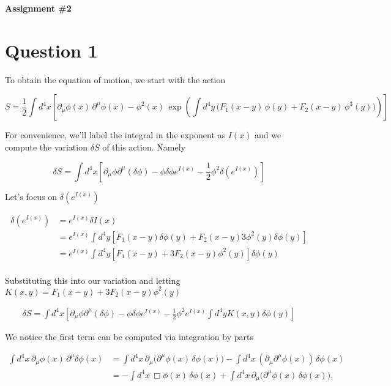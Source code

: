 \documentclass[12pt]{article}
\newcommand{\delmu}{\partial_{\mu}}
\newcommand{\delMu}{\partial^{\mu}}
\begin{document}
\begin{center}
    \Large \textbf{Assignment \#2}
\end{center}
\vspace{1cm}

\section*{Question 1}
To obtain the equation of motion, we start with the action

\begin{equation*}
    S = \frac{1}{2} \int d^4x \left[ \partial_\mu \phi(x) \, \partial^\mu
    \phi(x) - \phi^2(x) \, \exp\left( \int d^4y \, \Big( F_1(x-y)\,
\phi(y) + F_2(x-y)\, \phi^3(y) \Big) \right) \right]
\end{equation*}

For convenience, we'll label the integral in the exponent as $I(x)$ and we
compute the variation $\delta S$ of this action. Namely

\begin{equation*}
    \delta S = \int d^4x \left[ \delmu\phi\delMu(\delta\phi)
    -\phi\delta\phi e^{I(x)} -\frac{1}{2}\phi^2 \delta(e^{I(x)}) \right]
\end{equation*}

Let's focus on $\delta(e^{I(x)})$

\begin{align}
    \delta(e^{I(x)}) &= e^{I(x)} \delta I(x) \\
                     &= e^{I(x)} \int d^4y [F_1(x - y)\delta\phi(y) + F_2(x - y)
                     3\phi^2(y)\delta\phi(y)] \\
                     &= e^{I(x)} \int d^4y [F_1(x-y) + 3F_2(x-y)\phi^2(y)] \delta\phi(y) \\
\end{align}

Substituting this into our variation and letting $K(x, y) = F_1(x - y) + 3F_2(x - y)\phi^2(y)$

\begin{align*}
    \delta S = \int d^4x \left[ \delmu\phi\delMu(\delta\phi)
    -\phi\delta\phi e^{I(x)} -\frac{1}{2}\phi^2 e^{I(x)} \int d^4y K(x,y) \delta\phi(y) \right]
\end{align*}

We notice the first term can be computed via integration by parts

\begin{align}
\int d^4x \, \partial_\mu \phi(x)\, \partial^\mu \delta\phi(x)
&= \int d^4x \, \partial_\mu\!\big( \partial^\mu \phi(x)\,\delta\phi(x)\big)
   - \int d^4x \, (\partial_\mu \partial^\mu \phi(x))\,\delta\phi(x) \\
&= -\int d^4x \, \Box \phi(x)\,\delta\phi(x)
   + \int d^4x \, \partial_\mu\!\big( \partial^\mu \phi(x)\,\delta\phi(x)\big).
\end{align}
\end{document}
